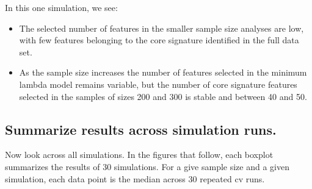 \documentclass[
]{book}
\begin{document}
In this one simulation, we see:

\begin{itemize}
\item
  The selected number of features in the smaller sample size analyses
  are low, with few features belonging to the core signature identified in the
  full data set.
\item
  As the sample size increases the number of features selected in the minimum
  lambda model remains variable, but the number of core signature features
  selected in the samples of sizes 200 and 300 is stable and between 40 and 50.
\end{itemize}

\hypertarget{summarize-results-across-simulation-runs.}{%
\subsection{Summarize results across simulation runs.}\label{summarize-results-across-simulation-runs.}}

Now look across all simulations. In the figures that follow, each boxplot
summarizes the results of 30 simulations. For a give sample size and a
given simulation, each data point is the median across 30 repeated cv runs.
\end{document}
